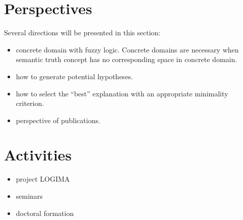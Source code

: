 \documentclass{article}
\begin{document}
\section{Perspectives}\label{sec:persp}
Several directions will be presented in this section:
\begin{itemize}
 \item concrete domain with fuzzy logic.
 Concrete domains are necessary when semantic truth concept has no corresponding space in concrete domain.
 \item how to generate potential hypotheses.
 \item how to select the ``best'' explanation with an appropriate minimality criterion.
 \item perspective of publications.
\end{itemize}

\section{Activities}
\begin{itemize}
 \item project LOGIMA
 \item seminars
 \item doctoral formation
\end{itemize}



\end{document}

